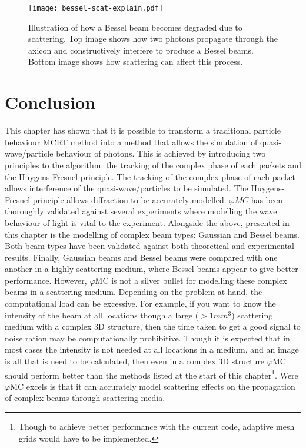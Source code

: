 \begin{figure}[!htbp]
    \centering
    \texttt{[image: bessel-scat-explain.pdf]}
    \caption{Illustration of how a Bessel beam becomes degraded due to scattering. Top image shows how two photons propagate through the axicon and constructively interfere to produce a Bessel beams. Bottom image shows how scattering can affect this process.}
    \label{fig:bessel-scat-explain}
\end{figure}



\section{Conclusion}

This chapter has shown that it is possible to transform a traditional particle behaviour MCRT method into a method that allows the simulation of quasi-wave/particle behaviour of photons.
This is achieved by introducing two principles to the algorithm: the tracking of the complex phase of each packets and the Huygens-Fresnel principle.
The tracking of the complex phase of each packet allows interference of the quasi-wave/particles to be simulated.
The Huygens-Fresnel principle allows diffraction to be accurately modelled.
$\varphi MC$ has been thoroughly validated against several experiments where modelling the wave behaviour of light is vital to the experiment.
Alongside the above, presented in this chapter is the modelling of complex beam types: Gaussian and Bessel beams.
Both beam types have been validated against both theoretical and experimental results.
Finally, Gaussian beams and Bessel beams were compared with one another in a highly scattering medium, where Bessel beams appear to give better performance.
However, $\varphi$MC is not a silver bullet for modelling these complex beams in a scattering medium.
Depending on the problem at hand, the computational load can be excessive.
For example, if you want to know the intensity of the beam at all locations though a large ($> 1mm^3$) scattering medium with a complex 3D structure, then the time taken to get a good signal to noise ration may be computationally prohibitive.
Though it is expected that in most cases the intensity is not needed at all locations in a medium, and an image is all that is need to be calculated, then even in a complex 3D structure $\varphi$MC should perform better than the methods listed at the start of this chapter\footnote{Though to achieve better performance with the current code, adaptive mesh grids would have to be implemented.}.
Were $\varphi$MC excels is that it can accurately model scattering effects on the propagation of complex beams through scattering media.


